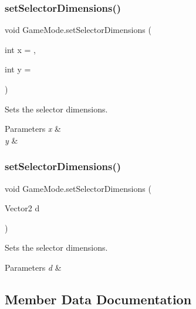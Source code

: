 \subsubsection{\texorpdfstring{set\+Selector\+Dimensions()}{setSelectorDimensions()}\hspace{0.1cm}{\footnotesize\ttfamily [1/2]}}
{\footnotesize\ttfamily void Game\+Mode.\+set\+Selector\+Dimensions (\begin{DoxyParamCaption}\item[{int}]{x = {},  }\item[{int}]{y = {} }\end{DoxyParamCaption})}



Sets the selector dimensions. 


\begin{DoxyParams}{Parameters}
{\em x} & \\
\hline
{\em y} & \\
\hline
\end{DoxyParams}
\mbox{\label{class_game_mode_a4c21d4c2047f2e8be9638133b536b200}} 
\subsubsection{\texorpdfstring{set\+Selector\+Dimensions()}{setSelectorDimensions()}\hspace{0.1cm}{\footnotesize\ttfamily [2/2]}}
{\footnotesize\ttfamily void Game\+Mode.\+set\+Selector\+Dimensions (\begin{DoxyParamCaption}\item[{Vector2}]{d }\end{DoxyParamCaption})}



Sets the selector dimensions. 


\begin{DoxyParams}{Parameters}
{\em d} & \\
\hline
\end{DoxyParams}


\subsection{Member Data Documentation}
\mbox{\label{class_game_mode_aada21e937be16ab599f8f7501e23c8c4}} 
